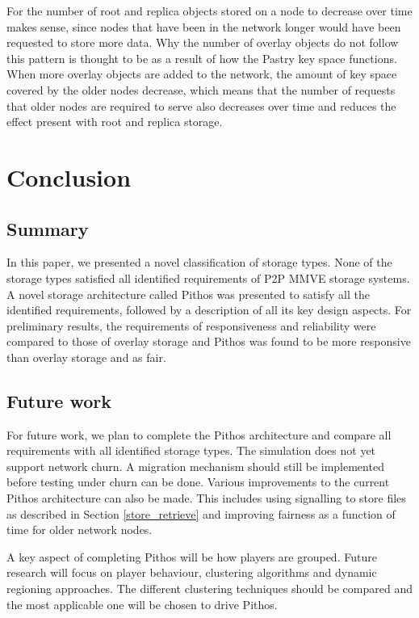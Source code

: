 \documentclass[10pt,a4paper,conference]{IEEEtran}
\begin{document}
For the number of root and replica objects stored on a node to decrease over time makes sense, since nodes that have been in the network longer would
have been requested to store more data. Why the number of overlay objects do not follow this pattern is thought to be as a result of how the Pastry
key space functions. When more overlay objects are added to the network, the amount of key space covered by the older nodes decrease, which means
that the number of requests that older nodes are required to serve also decreases over time and reduces the effect present with root and replica
storage.

\section{Conclusion}
\label{conclusion}

\subsection{Summary}

In this paper, we presented a novel classification of storage types. None of the storage types satisfied all identified requirements of P2P MMVE
storage systems. A novel storage architecture called Pithos was presented to satisfy all the identified requirements, followed by a description of
all its key design aspects. For preliminary results, the requirements of responsiveness and reliability were compared to those of overlay storage and
Pithos was found to be more responsive than overlay storage and as fair.

\subsection{Future work}

For future work, we plan to complete the Pithos architecture and compare all requirements with all identified storage types. The simulation does not
yet support network churn. A migration mechanism should still be implemented before testing under churn can be done. Various improvements to the
current Pithos architecture can also be made. This includes using signalling to store files as described in Section \ref{store_retrieve} and
improving fairness as a function of time for older network nodes.

A key aspect of completing Pithos will be how players are grouped. Future research will focus on player behaviour, clustering algorithms and dynamic
regioning approaches. The different clustering techniques should be compared and the most applicable one will be chosen to drive Pithos.
\end{document}
